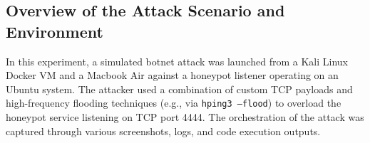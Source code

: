 \documentclass{article}
\begin{document}
\subsection*{Overview of the Attack Scenario and Environment}
\noindent
In this experiment, a simulated botnet attack was launched from a Kali Linux Docker VM and a Macbook Air against a honeypot listener operating on an Ubuntu system. The attacker used a combination of custom TCP payloads and high-frequency flooding techniques (e.g., via \texttt{hping3 --flood}) to overload the honeypot service listening on TCP port 4444. The orchestration of the attack was captured through various screenshots, logs, and code execution outputs.
\end{document}
